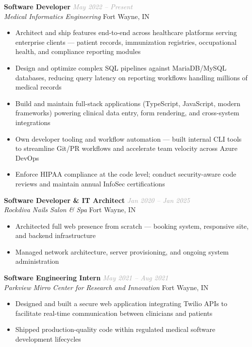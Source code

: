 \documentclass[10pt,letterpaper]{article}
\newcommand{\entry}[4]{%
    \noindent\textbf{#1} \hfill \textcolor{darkgray}{\textit{#2}} \\[-2pt]
    \textit{#3} \hfill \textcolor{medgray}{#4}\par
}
\begin{document}
\entry{Software Developer}{May 2022 -- Present}{Medical Informatics Engineering}{Fort Wayne, IN}
\vspace{-2pt}
\begin{itemize}[leftmargin=12pt, itemsep=0pt, topsep=1pt, parsep=0pt]
    \small
    \item Architect and ship features end-to-end across healthcare platforms serving enterprise clients --- patient records, immunization registries, occupational health, and compliance reporting modules
    \item Design and optimize complex SQL pipelines against MariaDB/MySQL databases, reducing query latency on reporting workflows handling millions of medical records
    \item Build and maintain full-stack applications (TypeScript, JavaScript, modern frameworks) powering clinical data entry, form rendering, and cross-system integrations
    \item Own developer tooling and workflow automation --- built internal CLI tools to streamline Git/PR workflows and accelerate team velocity across Azure DevOps
    \item Enforce HIPAA compliance at the code level; conduct security-aware code reviews and maintain annual InfoSec certifications
\end{itemize}

\vspace{2pt}
\entry{Software Developer \& IT Architect}{Jan 2020 -- Jan 2025}{Rockdiva Nails Salon \& Spa}{Fort Wayne, IN}
\vspace{-2pt}
\begin{itemize}[leftmargin=12pt, itemsep=0pt, topsep=1pt, parsep=0pt]
    \small
    \item Architected full web presence from scratch --- booking system, responsive site, and backend infrastructure
    \item Managed network architecture, server provisioning, and ongoing system administration
\end{itemize}

\vspace{2pt}
\entry{Software Engineering Intern}{May 2021 -- Aug 2021}{Parkview Mirro Center for Research and Innovation}{Fort Wayne, IN}
\vspace{-2pt}
\begin{itemize}[leftmargin=12pt, itemsep=0pt, topsep=1pt, parsep=0pt]
    \small
    \item Designed and built a secure web application integrating Twilio APIs to facilitate real-time communication between clinicians and patients
    \item Shipped production-quality code within regulated medical software development lifecycles
\end{itemize}
\end{document}
